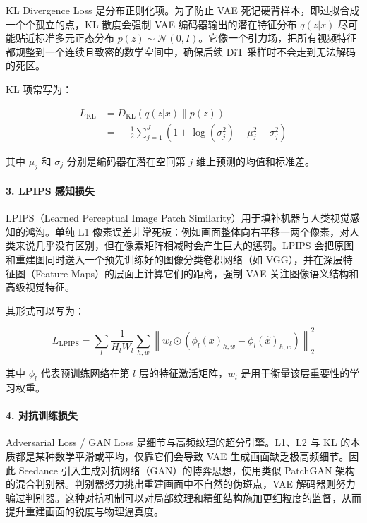 KL Divergence Loss 是分布正则化项。为了防止 VAE 死记硬背样本，即过拟合成一个个孤立的点，KL 散度会强制 VAE 编码器输出的潜在特征分布 \(q(z|x)\) 尽可能贴近标准多元正态分布 \(p(z)\sim\mathcal{N}(0,I)\)。它像一个引力场，把所有视频特征都规整到一个连续且致密的数学空间中，确保后续 DiT 采样时不会走到无法解码的死区。

KL 项常写为：

\[
\begin{aligned}
L_{\mathrm{KL}}
&=
D_{\mathrm{KL}}(q(z|x)\|p(z))
\\
&=
{}-\frac{1}{2}\sum_{j=1}^{J}
\left(1+\log(\sigma_j^2)-\mu_j^2-\sigma_j^2\right)
\end{aligned}
\]

其中 \(\mu_j\) 和 \(\sigma_j\) 分别是编码器在潜在空间第 \(j\) 维上预测的均值和标准差。

\hypertarget{lpips-ux611fux77e5ux635fux5931}{%
\paragraph{3. LPIPS 感知损失}\label{lpips-ux611fux77e5ux635fux5931}}

LPIPS（Learned Perceptual Image Patch Similarity）用于填补机器与人类视觉感知的鸿沟。单纯 L1 像素误差非常死板：例如画面整体向右平移一两个像素，对人类来说几乎没有区别，但在像素矩阵相减时会产生巨大的惩罚。LPIPS 会把原图和重建图同时送入一个预先训练好的图像分类卷积网络（如 VGG），并在深层特征图（Feature Maps）的层面上计算它们的距离，强制 VAE 关注图像语义结构和高级视觉特征。

其形式可以写为：

\[
L_{\mathrm{LPIPS}} =
\sum_l
\frac{1}{H_l W_l}
\sum_{h,w}
\left\|
w_l\odot
\left(
\phi_l(x)_{h,w}-\phi_l(\hat{x})_{h,w}
\right)
\right\|_2^2
\]

其中 \(\phi_l\) 代表预训练网络在第 \(l\) 层的特征激活矩阵，\(w_l\) 是用于衡量该层重要性的学习权重。

\hypertarget{ux5bf9ux6297ux8badux7ec3ux635fux5931}{%
\paragraph{4. 对抗训练损失}\label{ux5bf9ux6297ux8badux7ec3ux635fux5931}}

Adversarial Loss / GAN Loss 是细节与高频纹理的超分引擎。L1、L2 与 KL 的本质都是某种数学平滑或平均，仅靠它们会导致 VAE 生成画面缺乏极高频细节。因此 Seedance 引入生成对抗网络（GAN）的博弈思想，使用类似 PatchGAN 架构的混合判别器。判别器努力挑出重建画面中不自然的伪斑点，VAE 解码器则努力骗过判别器。这种对抗机制可以对局部纹理和精细结构施加更细粒度的监督，从而提升重建画面的锐度与物理逼真度。

